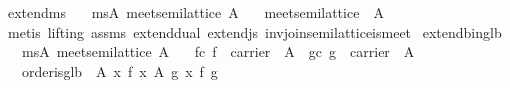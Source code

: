 \begin{isabellebody}
{\isafoldproof}%
%
\isadelimproof
\isanewline
%
\endisadelimproof
\isanewline
{}\isamarkupfalse%
\ extend{}ms{}\isanewline
\ \ \ ms{}A{}\ {}meet{}semilattice\ A{}\isanewline
\ \ \ {}meet{}semilattice\ {}{}\ A{}{}\isanewline
%
\isadelimproof
\ \ %
\endisadelimproof
%
\isatagproof
{}\isamarkupfalse%
\ {}metis\ {}lifting{}\ assms\ extend{}dual\ extend{}js\ inv{}join{}semilattice{}is{}meet{}%
\endisatagproof
{\isafoldproof}%
%
\isadelimproof
\isanewline
%
\endisadelimproof
\isanewline
{}\isamarkupfalse%
\ extend{}binglb{}\isanewline
\ \ \ ms{}A{}\ {}meet{}semilattice\ A{}\isanewline
\ \ \ fc{}\ {}f\ {}\ carrier\ {}{}\ A{}{}\ \ gc{}\ {}g\ {}\ carrier\ {}{}\ A{}{}\isanewline
\ \ \ {}order{}is{}glb\ {}{}\ A{}\ {}{}x{}\ f\ x\ {}\isactrlbsub A\isactrlesub \ g\ x{}\ {}f{}\ g{}{}\isanewline

\end{isabellebody}
